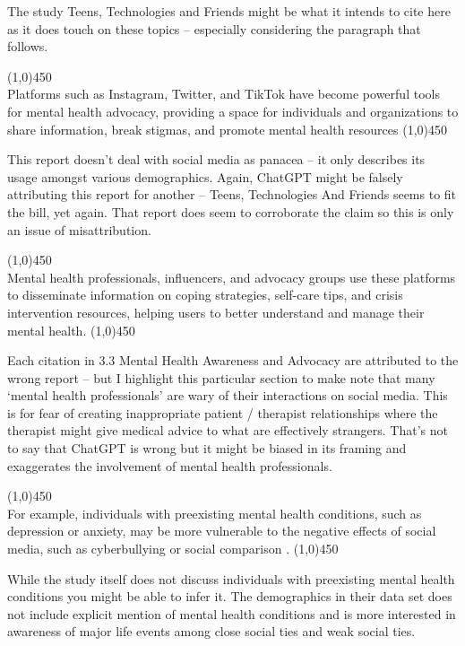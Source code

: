 \documentclass[12pt]{article}
\begin{document}
The study Teens, Technologies and Friends\cite{lenhart2015} might be what it intends to cite here as it does touch on these topics -- especially considering the paragraph that follows. 

\begin{center}
    \line(1,0){450}\\
    Platforms such as Instagram, Twitter, and TikTok have become powerful tools for mental health advocacy, providing a space for individuals and organizations to share information, break stigmas, and promote mental health resources \cite{smith2018}
    \line(1,0){450}
\end{center}
This report doesn't deal with social media as panacea -- it only describes its usage amongst various demographics. Again, ChatGPT might be falsely attributing this report for another -- Teens, Technologies And Friends\cite{lenhart2015} seems to fit the bill, yet again. That report does seem to corroborate the claim so this is only an issue of misattribution.

\begin{center}
    \line(1,0){450}\\
    Mental health professionals, influencers, and advocacy groups use these platforms to disseminate information on coping strategies, self-care tips, and crisis intervention resources, helping users to better understand and manage their mental health.
    \line(1,0){450}
\end{center}
Each citation in 3.3 Mental Health Awareness and Advocacy are attributed to the wrong report -- but I highlight this particular section to make note that many `mental health professionals' are wary of their interactions on social media. This is for fear of creating inappropriate patient / therapist relationships where the therapist might give medical advice to what are effectively strangers. That's not to say that ChatGPT is wrong but it might be biased in its framing and exaggerates the involvement of mental health professionals. 

\begin{center}
    \line(1,0){450}\\
    For example, individuals with preexisting mental health conditions, such as depression or anxiety, may be more vulnerable to the negative effects of social media, such as cyberbullying or social comparison \cite{hampton2014}.
    \line(1,0){450}
\end{center}
While the study itself does not discuss individuals with preexisting mental health conditions you might be able to infer it. The demographics in their data set does not include explicit mention of mental health conditions and is more interested in awareness of major life events among close social ties and weak social ties.  
\\\\
\end{document}
